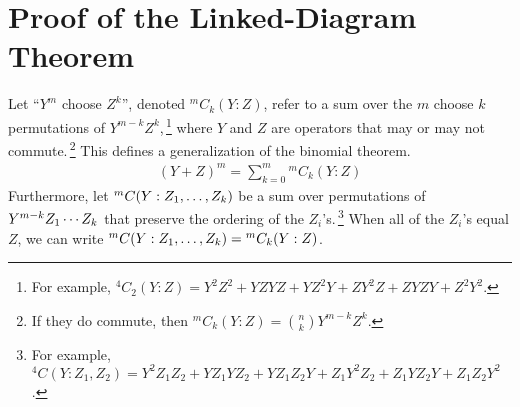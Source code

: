 \documentclass[11pt]{article}
\numberwithin{equation}{section}
\begin{document}






\newpage
\appendix
\section{Proof of the Linked-Diagram Theorem}\label{app:linked-diagram-theorem}

\begin{ntt}\label{ntt:operator-combinations}
Let
``$Y^m$ choose $Z^k$'', denoted ${}^mC_k(Y:Z)$,
refer to a sum over the $m$ choose $k$ permutations of $Y^{m-k}Z^k$,\,\footnote{For example,
$
  {}^4C_2(Y:Z)
=
  Y^2Z^2
+
  YZYZ
+
  YZ^2Y
+
  ZY^2Z
+
  ZYZY
+
  Z^2Y^2
$.
}
where $Y$ and $Z$ are operators that may or may not commute.\,\footnote{
  If they do commute, then ${}^mC_k(Y:Z)={n\choose k}Y^{m-k}Z^k$.
}
This defines a generalization of the binomial theorem.
\begin{align}
\label{eq:generalized-binomial-theorem}
  (
    Y
  +
    Z
  )^m
=
  \sum_{k=0}^m
  {}^mC_k(Y:Z)
\end{align}
Furthermore, let
$
  {}^mC(Y:Z_1,\ldots,Z_k)
$
be a sum over permutations of
$
  Y^{m-k}
  Z_1\cdots Z_k
$ that preserve the ordering of the $Z_i$'s.\,\footnote{
  For example,
$
  {}^4C(Y:Z_1,Z_2)
=
  Y^2Z_1Z_2
+
  YZ_1YZ_2
+
  YZ_1Z_2Y
+
  Z_1Y^2Z_2
+
  Z_1YZ_2Y
+
  Z_1Z_2Y^2
$.
}
When all of the $Z_i$'s equal $Z$, we can write
$
  {}^mC(Y:Z_1,\ldots,Z_k)
=
  {}^mC_k(Y:Z)
$.
\end{ntt}

\begin{prop}
\label{prop:wavefunction-infinite-recursion}
\end{prop}
\end{document}
